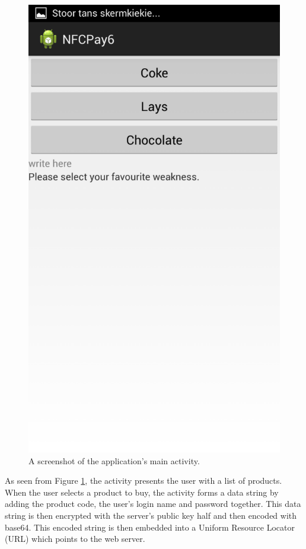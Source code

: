 \begin{figure}
 \centering 
 \includegraphics[clip = true, trim = 0 750 0 60,
 scale=0.2]{main_menu}
 \caption{A screenshot of the application's main activity.}
 \label{fig:main-activity-screenshot}
\end{figure}

As seen from Figure \ref{fig:main-activity-screenshot}, the activity presents
the user with a list of products. When the user selects a product to buy, the
activity forms a data string by adding the product code, the user's login
name and password together. This data string is then encrypted with the
server's public key half and then encoded with base64. This encoded string
is then embedded into a Uniform Resource Locator (URL) which points to the
web server. 


